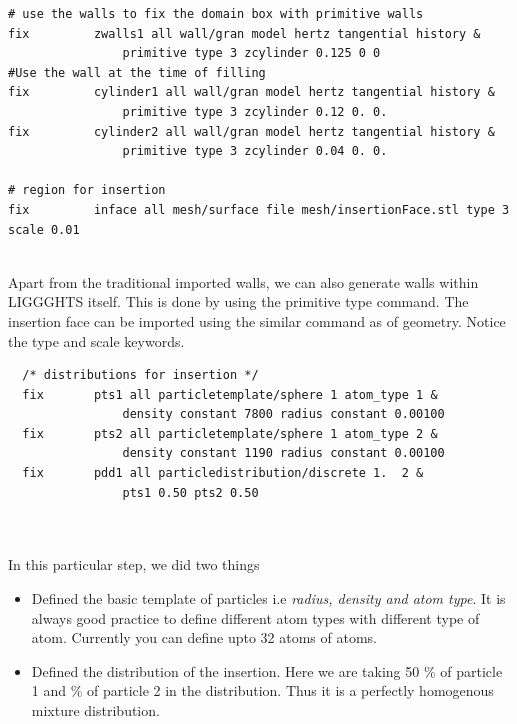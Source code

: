 \documentclass{tufte-book} %
\begin{document}
  \begin{verbatim}
# use the walls to fix the domain box with primitive walls
fix 		zwalls1 all wall/gran model hertz tangential history &
                primitive type 3 zcylinder 0.125 0 0
#Use the wall at the time of filling
fix 		cylinder1 all wall/gran model hertz tangential history &
                primitive type 3 zcylinder 0.12 0. 0. 
fix 		cylinder2 all wall/gran model hertz tangential history &
                primitive type 3 zcylinder 0.04 0. 0. 

# region for insertion
fix 		inface all mesh/surface file mesh/insertionFace.stl type 3 scale 0.01


\end{verbatim}
Apart from the traditional imported walls, we can also generate walls within LIGGGHTS itself. This is done by using the primitive type command. 
The insertion face can be imported using the similar command as of geometry. Notice the type and scale keywords.
\begin{verbatim}
  /* distributions for insertion */
  fix		pts1 all particletemplate/sphere 1 atom_type 1 &
                density constant 7800 radius constant 0.00100
  fix		pts2 all particletemplate/sphere 1 atom_type 2 &
                density constant 1190 radius constant 0.00100
  fix		pdd1 all particledistribution/discrete 1.  2 &
                pts1 0.50 pts2 0.50



              \end{verbatim}
In this particular step, we did two things
\begin{itemize}
\item Defined the basic template of particles i.e \textit{radius, density and atom type}. It is always good practice to define different atom types with different type of atom. Currently you can define upto 32 atoms of atoms.
\item Defined the distribution of the insertion. Here we are taking 50 \% of particle 1 and \% of particle 2 in the distribution. Thus it is a perfectly homogenous mixture distribution.
\end{itemize}
\end{document}
